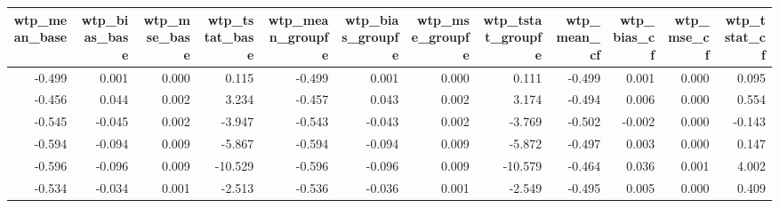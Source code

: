 \begin{tabular}{rrrrrrrrrrrr}
  \hline
wtp\_mean\_base & wtp\_bias\_base & wtp\_mse\_base & wtp\_tstat\_base & wtp\_mean\_groupfe & wtp\_bias\_groupfe & wtp\_mse\_groupfe & wtp\_tstat\_groupfe & wtp\_mean\_cf & wtp\_bias\_cf & wtp\_mse\_cf & wtp\_tstat\_cf \\ 
  \hline
-0.499 & 0.001 & 0.000 & 0.115 & -0.499 & 0.001 & 0.000 & 0.111 & -0.499 & 0.001 & 0.000 & 0.095 \\ 
  -0.456 & 0.044 & 0.002 & 3.234 & -0.457 & 0.043 & 0.002 & 3.174 & -0.494 & 0.006 & 0.000 & 0.554 \\ 
  -0.545 & -0.045 & 0.002 & -3.947 & -0.543 & -0.043 & 0.002 & -3.769 & -0.502 & -0.002 & 0.000 & -0.143 \\ 
  -0.594 & -0.094 & 0.009 & -5.867 & -0.594 & -0.094 & 0.009 & -5.872 & -0.497 & 0.003 & 0.000 & 0.147 \\ 
  -0.596 & -0.096 & 0.009 & -10.529 & -0.596 & -0.096 & 0.009 & -10.579 & -0.464 & 0.036 & 0.001 & 4.002 \\ 
  -0.534 & -0.034 & 0.001 & -2.513 & -0.536 & -0.036 & 0.001 & -2.549 & -0.495 & 0.005 & 0.000 & 0.409 \\ 
   \hline
\end{tabular}
